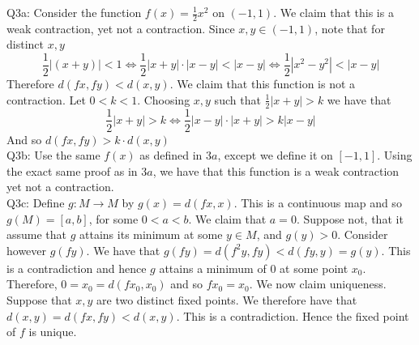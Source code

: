 \documentclass[letterpaper]{article}
\begin{document}
\noindent Q3a: Consider the function $f(x) = \frac{1}{2}x^2$ on $(-1,1)$. We claim that this is a weak contraction, yet not a contraction. Since $x,y\in (-1,1)$, note that for distinct $x,y$
$$\frac{1}{2}|(x+y)|<1 \iff \frac{1}{2}|x+y|\cdot|x-y|<|x-y| \iff \frac{1}{2}|x^2-y^2| < |x-y|$$
Therefore $d(fx,fy)<d(x,y)$. We claim that this function is not a contraction. Let $0<k<1$. Choosing $x,y$ such that $\frac{1}{2}|x+y|>k$ we have that $$\frac{1}{2}|x+y|> k \iff \frac{1}{2}|x-y|\cdot|x+y|>k|x-y|$$
And so $d(fx,fy)>k\cdot d(x,y)$
\newline \\ Q3b: Use the same $f(x)$ as defined in $3a$, except we define it on $[-1,1]$. Using the exact same proof as in $3a$, we have that this function is a weak contraction yet not a contraction. 
\newline \\ Q3c: Define $g: M\to M$ by $g(x) = d(fx,x)$. This is a continuous map and so $g(M)=[a,b]$, for some $0<a<b$. We claim that $a=0$. Suppose not, that it assume that $g$ attains its minimum at some $y\in M$, and $g(y)>0$. Consider however $g(fy)$. We have that $g(fy) = d(f^2y,fy)<d(fy,y)=g(y)$. This is a contradiction and hence $g$ attains a minimum of $0$ at some point $x_0$. Therefore, $0=x_0=d(fx_0,x_0)$ and so $fx_0=x_0$. We now claim uniqueness. Suppose that $x,y$ are two distinct fixed points. We therefore have that $d(x,y)=d(fx,fy)<d(x,y)$. This is a contradiction. Hence the fixed point of $f$ is unique. 
\end{document}
